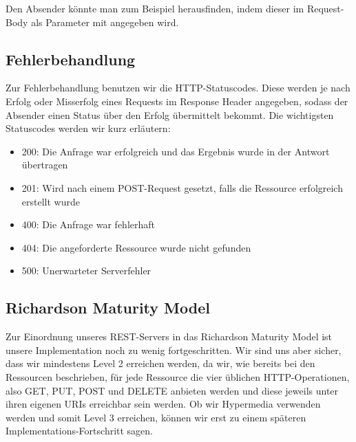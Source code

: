 Den Absender könnte man zum Beispiel herausfinden, indem dieser im Request-Body als Parameter mit angegeben wird.

\subsection{Fehlerbehandlung}

Zur Fehlerbehandlung benutzen wir die HTTP-Statuscodes. Diese werden je nach Erfolg oder Misserfolg eines Requests im Response Header angegeben, sodass der Absender einen Status über den Erfolg übermittelt bekommt. Die wichtigsten Statuscodes werden wir kurz erläutern:

\begin{itemize}
\item 200: Die Anfrage war erfolgreich und das Ergebnis wurde in der Antwort übertragen
\item 201: Wird nach einem POST-Request gesetzt, falls die Ressource erfolgreich erstellt wurde
\item 400: Die Anfrage war fehlerhaft
\item 404: Die angeforderte Ressource wurde nicht gefunden
\item 500: Unerwarteter Serverfehler
\end{itemize}

\subsection{Richardson Maturity Model}

Zur Einordnung unseres REST-Servers in das Richardson Maturity Model ist unsere Implementation noch zu wenig fortgeschritten. Wir sind uns aber sicher, dass wir mindestens Level 2 erreichen werden, da wir, wie bereits bei den Ressourcen beschrieben, für jede Ressource die vier üblichen HTTP-Operationen, also GET, PUT, POST und DELETE anbieten werden und diese jeweils unter ihren eigenen URIs erreichbar sein werden. Ob wir Hypermedia verwenden werden und somit Level 3 erreichen, können wir erst zu einem späteren Implementations-Fortschritt sagen.